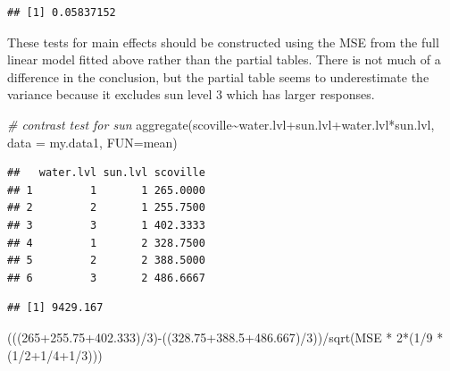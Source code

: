 \documentclass[
]{book}
\newenvironment{Shaded}{\begin{snugshade}}{\end{snugshade}}
\newcommand{\AttributeTok}[1]{\textcolor[rgb]{0.77,0.63,0.00}{#1}}
\newcommand{\CommentTok}[1]{\textcolor[rgb]{0.56,0.35,0.01}{\textit{#1}}}
\newcommand{\DecValTok}[1]{\textcolor[rgb]{0.00,0.00,0.81}{#1}}
\newcommand{\FloatTok}[1]{\textcolor[rgb]{0.00,0.00,0.81}{#1}}
\newcommand{\FunctionTok}[1]{\textcolor[rgb]{0.00,0.00,0.00}{#1}}
\newcommand{\NormalTok}[1]{#1}
\newcommand{\OtherTok}[1]{\textcolor[rgb]{0.56,0.35,0.01}{#1}}
\newcommand{\SpecialCharTok}[1]{\textcolor[rgb]{0.00,0.00,0.00}{#1}}
\begin{document}
\begin{verbatim}
## [1] 0.05837152
\end{verbatim}

These tests for main effects should be constructed using the MSE from the full linear model fitted above rather than the partial tables. There is not much of a difference in the conclusion, but the partial table seems to underestimate the variance because it excludes sun level 3 which has larger responses.

\begin{Shaded}
\begin{Highlighting}[]
\CommentTok{\# contrast test for sun}
\FunctionTok{aggregate}\NormalTok{(scoville}\SpecialCharTok{\textasciitilde{}}\NormalTok{water.lvl}\SpecialCharTok{+}\NormalTok{sun.lvl}\SpecialCharTok{+}\NormalTok{water.lvl}\SpecialCharTok{*}\NormalTok{sun.lvl, }\AttributeTok{data =}\NormalTok{ my.data1, }\AttributeTok{FUN=}\NormalTok{mean)}
\end{Highlighting}
\end{Shaded}

\begin{verbatim}
##   water.lvl sun.lvl scoville
## 1         1       1 265.0000
## 2         2       1 255.7500
## 3         3       1 402.3333
## 4         1       2 328.7500
## 5         2       2 388.5000
## 6         3       2 486.6667
\end{verbatim}

\begin{Shaded}
\end{Shaded}

\begin{verbatim}
## [1] 9429.167
\end{verbatim}

\begin{Shaded}
\begin{Highlighting}[]
\NormalTok{(((}\DecValTok{265}\FloatTok{+255.75+402.333}\NormalTok{)}\SpecialCharTok{/}\DecValTok{3}\NormalTok{)}\SpecialCharTok{{-}}\NormalTok{((}\FloatTok{328.75+388.5+486.667}\NormalTok{)}\SpecialCharTok{/}\DecValTok{3}\NormalTok{))}\SpecialCharTok{/}\FunctionTok{sqrt}\NormalTok{(MSE }\SpecialCharTok{*} \DecValTok{2}\SpecialCharTok{*}\NormalTok{(}\DecValTok{1}\SpecialCharTok{/}\DecValTok{9} \SpecialCharTok{*}\NormalTok{ (}\DecValTok{1}\SpecialCharTok{/}\DecValTok{2}\SpecialCharTok{+}\DecValTok{1}\SpecialCharTok{/}\DecValTok{4}\SpecialCharTok{+}\DecValTok{1}\SpecialCharTok{/}\DecValTok{3}\NormalTok{)))}
\end{Highlighting}
\end{Shaded}
\end{document}
